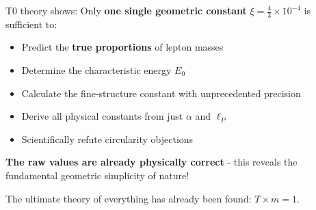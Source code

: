\documentclass[12pt,a4paper]{article}
\theoremstyle{definition}
\begin{document}
	\vspace{1cm}
	
	\begin{tcolorbox}[colback=green!10!white,colframe=green!75!black,title=The Ultimate Revolutionary Insight]
		T0 theory shows: Only \textbf{one single geometric constant} $\xi = \frac{4}{3} \times 10^{-4}$ is sufficient to:
		
		\begin{itemize}
			\item Predict the \textbf{true proportions} of lepton masses
			\item Determine the characteristic energy $E_0$  
			\item Calculate the fine-structure constant with unprecedented precision
			\item Derive all physical constants from just $\alpha$ and $\ell_P$
			\item Scientifically refute circularity objections
		\end{itemize}
		
		\textbf{The raw values are already physically correct} - this reveals the fundamental geometric simplicity of nature!
		
		\vspace{0.5cm}
		The ultimate theory of everything has already been found: $T \times m = 1$.
	\end{tcolorbox}
	
\end{document}
